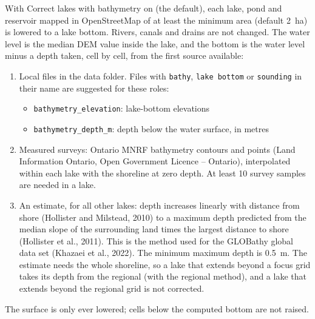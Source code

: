         With {\sf Correct lakes with bathymetry} on (the default), each lake, pond and reservoir mapped in OpenStreetMap of at least the minimum area (default 2~ha) is lowered to a lake bottom.  Rivers, canals and drains are not changed.  The water level is the median DEM value inside the lake, and the bottom is the water level minus a depth taken, cell by cell, from the first source available:
        \begin{enumerate}
        \item Local files in the data folder.  Files with {\tt bathy}, {\tt lake bottom} or {\tt sounding} in their name are suggested for these roles:
            \begin{itemize}
            \item {\tt bathymetry\_elevation}: lake-bottom elevations
            \item {\tt bathymetry\_depth\_m}: depth below the water surface, in metres
            \end{itemize}
        \item Measured surveys: Ontario MNRF bathymetry contours and points (Land Information Ontario, Open Government Licence -- Ontario), interpolated within each lake with the shoreline at zero depth.  At least 10 survey samples are needed in a lake.
        \item An estimate, for all other lakes: depth increases linearly with distance from shore (Hollister and Milstead, 2010) to a maximum depth predicted from the median slope of the surrounding land times the largest distance to shore (Hollister et al., 2011).  This is the method used for the GLOBathy global data set (Khazaei et al., 2022).  The minimum maximum depth is 0.5~m.  The estimate needs the whole shoreline, so a lake that extends beyond a focus grid takes its depth from the regional  (with the regional method), and a lake that extends beyond the regional grid is not corrected.
        \end{enumerate}
        The surface is only ever lowered; cells below the computed bottom are not raised.

